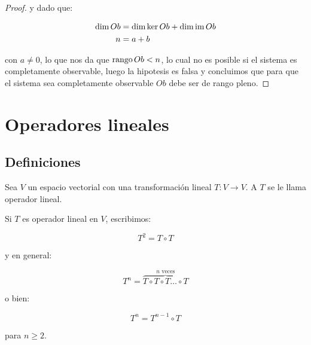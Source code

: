 \begin{proof}
			y dado que:

			\begin{align*}
				\dim{Ob} &= \dim{\ker{Ob}} + \dim{\operatorname{im}{Ob}} \\
				n &= a + b \\
			\end{align*}

			con $a \ne 0$, lo que nos da que $\operatorname{rango}{Ob} < n$, lo cual no es posible si el sistema es completamente observable, luego la hipotesis es falsa y concluimos que para que el sistema sea completamente observable $Ob$ debe ser de rango pleno.
		\end{proof}

\newpage
\section{Operadores lineales}

	\subsection{Definiciones}

		\begin{definicion}
			Sea $V$ un espacio vectorial con una transformación lineal $T \colon V \to V$.
			A $T$ se le llama operador lineal.
		\end{definicion}

		\begin{observacion}
			Si $T$ es operador lineal en $V$, escribimos:

			\begin{equation}
				T^2 = T \circ T
			\end{equation}

			y en general:

			\begin{equation}
				T^n = \overbrace{T \circ T \circ T \dots \circ T}^{n \text{ veces}}
			\end{equation}

			o bien:

			\begin{equation}
				T^n = T^{n-1} \circ T
			\end{equation}

			para $n \geq 2$.
		\end{observacion}

